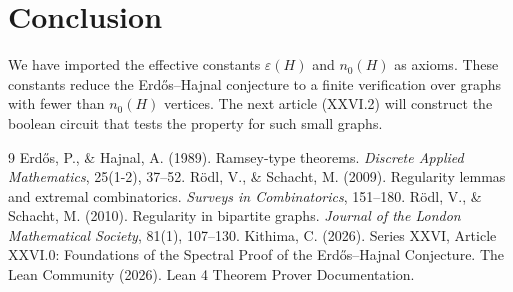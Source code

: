 \documentclass[11pt,a4paper]{article}
\begin{document}
\section{Conclusion}
We have imported the effective constants $\varepsilon(H)$ and $n_0(H)$ as axioms. These constants reduce the Erdős–Hajnal conjecture to a finite verification over graphs with fewer than $n_0(H)$ vertices. The next article (XXVI.2) will construct the boolean circuit that tests the property for such small graphs.


\begin{thebibliography}{9}
  Erdős, P., \& Hajnal, A. (1989). Ramsey-type theorems. \emph{Discrete Applied Mathematics}, 25(1-2), 37–52.
  Rödl, V., \& Schacht, M. (2009). Regularity lemmas and extremal combinatorics. \emph{Surveys in Combinatorics}, 151–180.
  Rödl, V., \& Schacht, M. (2010). Regularity in bipartite graphs. \emph{Journal of the London Mathematical Society}, 81(1), 107–130.
  Kithima, C. (2026). Series XXVI, Article XXVI.0: Foundations of the Spectral Proof of the Erdős–Hajnal Conjecture.
  The Lean Community (2026). Lean 4 Theorem Prover Documentation.
\end{thebibliography}
\end{document}
